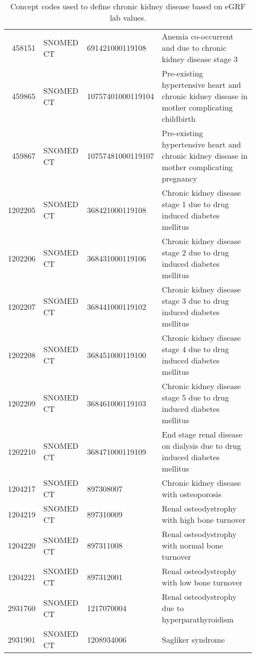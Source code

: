 \begin{table}[ht]
\begin{tabular}{rlll}
  458151 & SNOMED CT & 691421000119108 & Anemia co-occurrent and due to chronic kidney disease stage 3 \\ 
  459865 & SNOMED CT & 10757401000119104 & Pre-existing hypertensive heart and chronic kidney disease in mother complicating childbirth \\ 
  459867 & SNOMED CT & 10757481000119107 & Pre-existing hypertensive heart and chronic kidney disease in mother complicating pregnancy \\ 
  1202205 & SNOMED CT & 368421000119108 & Chronic kidney disease stage 1 due to drug induced diabetes mellitus \\ 
  1202206 & SNOMED CT & 368431000119106 & Chronic kidney disease stage 2 due to drug induced diabetes mellitus \\ 
  1202207 & SNOMED CT & 368441000119102 & Chronic kidney disease stage 3 due to drug induced diabetes mellitus \\ 
  1202208 & SNOMED CT & 368451000119100 & Chronic kidney disease stage 4 due to drug induced diabetes mellitus \\ 
  1202209 & SNOMED CT & 368461000119103 & Chronic kidney disease stage 5 due to drug induced diabetes mellitus \\ 
  1202210 & SNOMED CT & 368471000119109 & End stage renal disease on dialysis due to drug induced diabetes mellitus \\ 
  1204217 & SNOMED CT & 897308007 & Chronic kidney disease with osteoporosis \\ 
  1204219 & SNOMED CT & 897310009 & Renal osteodystrophy with high bone turnover \\ 
  1204220 & SNOMED CT & 897311008 & Renal osteodystrophy with normal bone turnover \\ 
  1204221 & SNOMED CT & 897312001 & Renal osteodystrophy with low bone turnover \\ 
  2931760 & SNOMED CT & 1217070004 & Renal osteodystrophy due to hyperparathyroidism \\ 
  2931901 & SNOMED CT & 1208934006 & Sagliker syndrome \\ 
   \hline
\end{tabular}
\caption{Concept codes used to define chronic kidney disease based on eGRF lab values.} 
\label{tab:codes_egfr}
\end{table}
